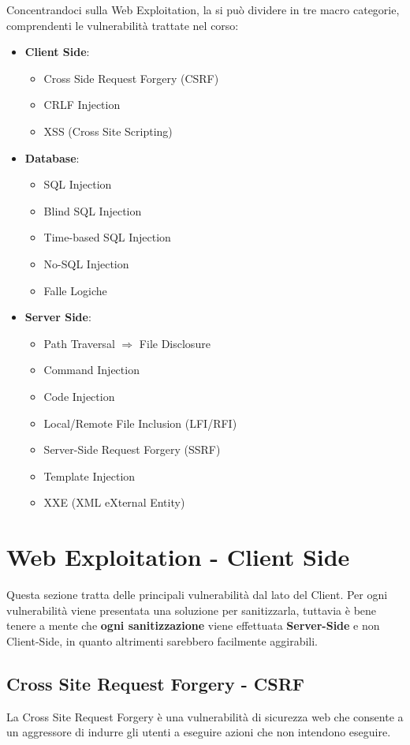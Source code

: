 \documentclass{article}
\begin{document}
Concentrandoci sulla Web Exploitation, la si può dividere in tre macro categorie, comprendenti le vulnerabilità trattate nel corso:
\begin{itemize}
    \item \textbf{Client Side}:  
    \begin{itemize}
        \item Cross Side Request Forgery (CSRF)
        \item CRLF Injection
        \item XSS (Cross Site Scripting)
    \end{itemize}
    \item \textbf{Database}:
    \begin{itemize}
        \item SQL Injection
        \item Blind SQL Injection
        \item Time-based SQL Injection
        \item No-SQL Injection
        \item Falle Logiche
    \end{itemize}
    \item \textbf{Server Side}:
    \begin{itemize}
        \item Path Traversal $\Rightarrow$ File Disclosure
        \item Command Injection
        \item Code Injection
        \item Local/Remote File Inclusion (LFI/RFI)
        \item Server-Side Request Forgery (SSRF)
        \item Template Injection
        \item XXE (XML eXternal Entity)
    \end{itemize}
\end{itemize}

\newpage
\section{Web Exploitation - Client Side}
Questa sezione tratta delle principali vulnerabilità dal lato del Client. Per ogni vulnerabilità viene presentata una soluzione per sanitizzarla, tuttavia è bene tenere a mente che \textbf{ogni sanitizzazione} viene effettuata \textbf{Server-Side} e non Client-Side, in quanto altrimenti sarebbero facilmente aggirabili.  

\subsection{Cross Site Request Forgery - CSRF}
La Cross Site Request Forgery è una vulnerabilità di sicurezza web che consente a un aggressore di indurre gli utenti a eseguire azioni che non intendono eseguire.
\end{document}

